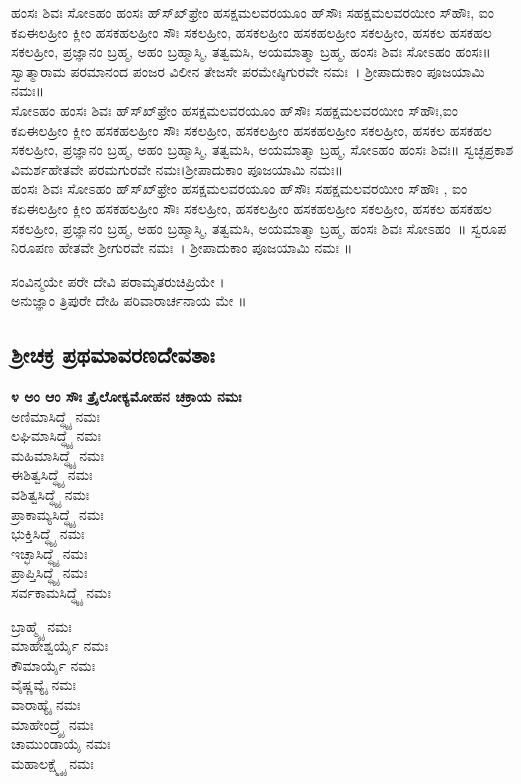  ಹಂಸಃ ಶಿವಃ ಸೋಽಹಂ ಹಂಸಃ ಹ್‌ಸ್‌ಖ್‌ಫ್ರೇಂ ಹಸಕ್ಷಮಲವರಯೂಂ ಹ್‌ಸೌಃ ಸಹಕ್ಷಮಲವರಯೀಂ ಸ್‌ಹೌಃ, ಐಂ ಕಏಈಲಹ್ರೀಂ ಕ್ಲೀಂ ಹಸಕಹಲಹ್ರೀಂ ಸೌಃ ಸಕಲಹ್ರೀಂ, ಹಸಕಲಹ್ರೀಂ ಹಸಕಹಲಹ್ರೀಂ ಸಕಲಹ್ರೀಂ, ಹಸಕಲ ಹಸಕಹಲ ಸಕಲಹ್ರೀಂ, ಪ್ರಜ್ಞಾನಂ ಬ್ರಹ್ಮ, ಅಹಂ ಬ್ರಹ್ಮಾಸ್ಮಿ, ತತ್ವಮಸಿ, ಅಯಮಾತ್ಮಾ ಬ್ರಹ್ಮ, ಹಂಸಃ ಶಿವಃ ಸೋಽಹಂ ಹಂಸಃ॥ ಸ್ವಾತ್ಮಾರಾಮ ಪರಮಾನಂದ ಪಂಜರ ವಿಲೀನ ತೇಜಸೇ ಪರಮೇಷ್ಠಿಗುರವೇ ನಮಃ~। ಶ್ರೀಪಾದುಕಾಂ ಪೂಜಯಾಮಿ ನಮಃ॥\\
 ಸೋಽಹಂ ಹಂಸಃ ಶಿವಃ ಹ್‌ಸ್‌ಖ್‌ಫ್ರೇಂ ಹಸಕ್ಷಮಲವರಯೂಂ ಹ್‌ಸೌಃ ಸಹಕ್ಷಮಲವರಯೀಂ ಸ್‌ಹೌಃ,ಐಂ ಕಏಈಲಹ್ರೀಂ ಕ್ಲೀಂ ಹಸಕಹಲಹ್ರೀಂ ಸೌಃ ಸಕಲಹ್ರೀಂ, ಹಸಕಲಹ್ರೀಂ ಹಸಕಹಲಹ್ರೀಂ ಸಕಲಹ್ರೀಂ, ಹಸಕಲ ಹಸಕಹಲ ಸಕಲಹ್ರೀಂ, ಪ್ರಜ್ಞಾನಂ ಬ್ರಹ್ಮ, ಅಹಂ ಬ್ರಹ್ಮಾಸ್ಮಿ, ತತ್ವಮಸಿ, ಅಯಮಾತ್ಮಾ ಬ್ರಹ್ಮ, ಸೋಽಹಂ ಹಂಸಃ ಶಿವಃ॥ ಸ್ವಚ್ಛಪ್ರಕಾಶ ವಿಮರ್ಶಹೇತವೇ ಪರಮಗುರವೇ ನಮಃ।ಶ್ರೀಪಾದುಕಾಂ ಪೂಜಯಾಮಿ ನಮಃ॥\\
 ಹಂಸಃ ಶಿವಃ ಸೋಽಹಂ ಹ್‌ಸ್‌ಖ್‌ಫ್ರೇಂ ಹಸಕ್ಷಮಲವರಯೂಂ ಹ್‌ಸೌಃ ಸಹಕ್ಷಮಲವರಯೀಂ ಸ್‌ಹೌಃ , ಐಂ ಕಏಈಲಹ್ರೀಂ ಕ್ಲೀಂ ಹಸಕಹಲಹ್ರೀಂ ಸೌಃ ಸಕಲಹ್ರೀಂ, ಹಸಕಲಹ್ರೀಂ ಹಸಕಹಲಹ್ರೀಂ ಸಕಲಹ್ರೀಂ, ಹಸಕಲ ಹಸಕಹಲ ಸಕಲಹ್ರೀಂ, ಪ್ರಜ್ಞಾನಂ ಬ್ರಹ್ಮ, ಅಹಂ ಬ್ರಹ್ಮಾಸ್ಮಿ, ತತ್ವಮಸಿ, ಅಯಮಾತ್ಮಾ ಬ್ರಹ್ಮ, ಹಂಸಃ ಶಿವಃ ಸೋಽಹಂ~॥ ಸ್ವರೂಪ ನಿರೂಪಣ ಹೇತವೇ ಶ್ರೀಗುರವೇ ನಮಃ~। ಶ್ರೀಪಾದುಕಾಂ ಪೂಜಯಾಮಿ ನಮಃ ॥

ಸಂವಿನ್ಮಯೇ ಪರೇ ದೇವಿ ಪರಾಮೃತರುಚಿಪ್ರಿಯೇ ।\\
 ಅನುಜ್ಞಾಂ ತ್ರಿಪುರೇ ದೇಹಿ ಪರಿವಾರಾರ್ಚನಾಯ ಮೇ ॥
 
\subsection{ಶ್ರೀಚಕ್ರ ಪ್ರಥಮಾವರಣದೇವತಾಃ}
{\bfseries ೪ ಅಂ ಆಂ ಸೌಃ ತ್ರೈಲೋಕ್ಯಮೋಹನ ಚಕ್ರಾಯ ನಮಃ }\\
 ಅಣಿಮಾಸಿದ್ಧ್ಯೈ ನಮಃ\\
 ಲಘಿಮಾಸಿದ್ಧ್ಯೈ ನಮಃ\\
 ಮಹಿಮಾಸಿದ್ಧ್ಯೈ ನಮಃ\\
 ಈಶಿತ್ವಸಿದ್ಧ್ಯೈ ನಮಃ\\
 ವಶಿತ್ವಸಿದ್ಧ್ಯೈ ನಮಃ\\
 ಪ್ರಾಕಾಮ್ಯಸಿದ್ಧ್ಯೈ ನಮಃ\\
 ಭುಕ್ತಿಸಿದ್ಧ್ಯೈ ನಮಃ\\
 ಇಚ್ಛಾಸಿದ್ಧ್ಯೈ ನಮಃ\\
 ಪ್ರಾಪ್ತಿಸಿದ್ಧ್ಯೈ ನಮಃ\\
 ಸರ್ವಕಾಮಸಿದ್ಧ್ಯೈ ನಮಃ

 ಬ್ರಾಹ್ಮ್ಯೈ ನಮಃ\\
 ಮಾಹೇಶ್ವರ್ಯೈ ನಮಃ\\
 ಕೌಮಾರ್ಯೈ ನಮಃ\\
 ವೈಷ್ಣವ್ಯೈ ನಮಃ\\
 ವಾರಾಹ್ಯೈ ನಮಃ\\
 ಮಾಹೇಂದ್ರ್ಯೈ ನಮಃ\\
 ಚಾಮುಂಡಾಯೈ ನಮಃ\\
 ಮಹಾಲಕ್ಷ್ಮ್ಯೈ ನಮಃ

